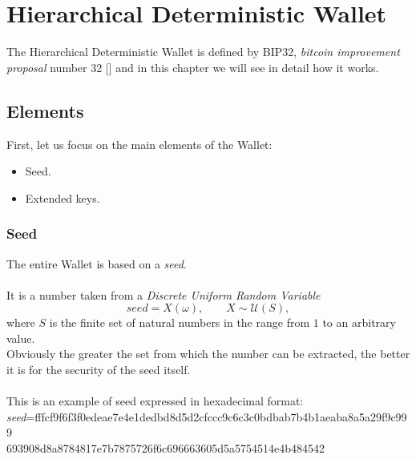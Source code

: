 \chapter{Hierarchical Deterministic Wallet} %

\label{hd wallet}
The Hierarchical Deterministic Wallet is defined by BIP32, \textit{bitcoin improvement proposal} number 32 [\cite{1}] and in this chapter we will see in detail how it works.

\section{Elements}
First, let us focus on the main elements of the Wallet:
\begin{itemize}[label=$\diamond$]
	\item Seed.
	\item Extended keys.
\end{itemize}

\subsection{Seed}
The entire Wallet is based on a \textit{seed}.
\\ \\
It is a number taken from a \textit{Discrete Uniform Random Variable}
\begin{equation*}
seed=X(\omega), \qquad X\sim \mathcal{U}(S),
\end{equation*}
where $S$ is the finite set of natural numbers in the range from $1$ to an arbitrary value.\\ Obviously the greater the set from which the number can be extracted, the better it is for the security of the seed itself.
\\ \\
This is an example of seed expressed in hexadecimal format: \\
\textit{seed}=fffcf9f6f3f0edeae7e4e1dedbd8d5d2cfccc9c6c3c0bdbab7b4b1aeaba8a5a29f9c999 \\ 693908d8a8784817e7b7875726f6c696663605d5a5754514e4b484542 

